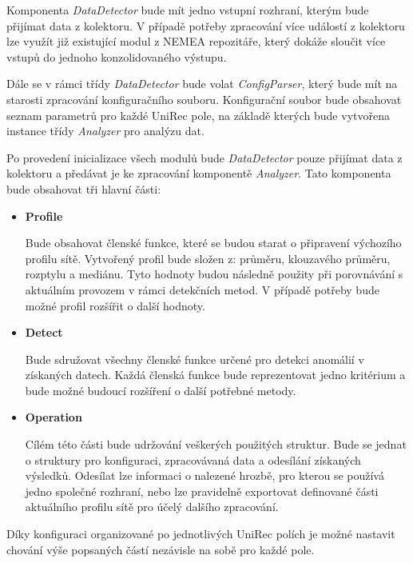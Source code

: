  Komponenta \textit{DataDetector} bude mít jedno vstupní rozhraní, kterým bude přijímat data z kolektoru.
 V případě potřeby
 zpracování více událostí z kolektoru lze využít již existující modul z NEMEA repozitáře, který
 dokáže sloučit více vstupů do jednoho konzolidovaného výstupu. 
 
 Dále se v rámci třídy \textit{DataDetector} bude volat \textit{ConfigParser}, který bude mít na starosti zpracování 
 konfiguračního souboru. Konfigurační soubor bude obsahovat seznam parametrů pro každé UniRec pole,
 na základě kterých bude vytvořena instance třídy \textit{Analyzer} pro analýzu dat. 
 
 Po provedení inicializace všech modulů bude \textit{DataDetector} pouze přijímat data z kolektoru a 
 předávat je ke zpracování komponentě \textit{Analyzer}. Tato komponenta bude obsahovat
 tři hlavní části:
 \begin{itemize}
  \item \textbf{Profile}
  
  Bude obsahovat členské funkce, které se budou starat o připravení výchozího profilu sítě. 
  Vytvořený profil bude složen z: průměru, klouzavého průměru, rozptylu a mediánu.
  Tyto hodnoty budou následně použity při porovnávání s aktuálním provozem v rámci detekčních
  metod. V případě potřeby bude možné profil rozšířit o další hodnoty.
  
  \item \textbf{Detect}
  
  Bude sdružovat všechny členské funkce určené pro detekci anomálií v získaných datech. 
  Každá členská funkce bude reprezentovat jedno kritérium a bude možné budoucí rozšíření o další
  potřebné metody.
  
  \item \textbf{Operation}
  
  Cílém této části bude udržování veškerých použitých struktur. Bude se jednat o struktury 
  pro konfiguraci, zpracovávaná data a odesílání získaných výsledků. Odesílat lze informaci o 
  nalezené hrozbě, pro kterou se používá jedno společné rozhraní, nebo lze pravidelně exportovat
  definované části aktuálního profilu sítě pro účelý dalšího zpracování. 
  
 \end{itemize}

 Díky konfiguraci organizované po jednotlivých UniRec polích je možné nastavit chování výše
 popsaných částí nezávisle na sobě pro každé pole.
 
